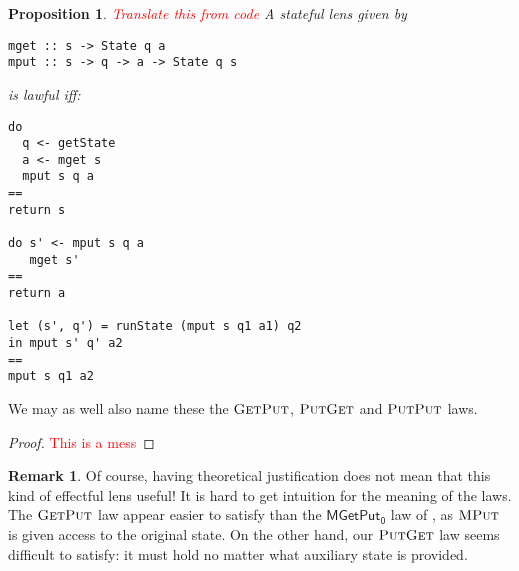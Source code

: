 \documentclass[11pt,a4paper]{article}
\theoremstyle{plain}
\newtheorem{proposition}[theorem]{Proposition}
\theoremstyle{definition}
\newtheorem{remark}[theorem]{Remark}
\newcommand{\C}{\mathscr{C}}
\newcommand{\homC}{\underline{\C}}
\newcommand{\fget}{\textsc{Get}}
\newcommand{\fput}{\textsc{Put}}
\newcommand{\mput}{\textsc{MPut}}
\newcommand{\todo}[1]{\textcolor{red}{\small #1}}
\begin{document}
\begin{proposition}
\todo{Translate this from code}
A stateful lens given by 
\begin{verbatim}
mget :: s -> State q a 
mput :: s -> q -> a -> State q s
\end{verbatim}
is lawful iff:
\begin{verbatim}
do
  q <- getState
  a <- mget s
  mput s q a
==
return s

do s' <- mput s q a
   mget s'
== 
return a

let (s', q') = runState (mput s q1 a1) q2
in mput s' q' a2
==
mput s q1 a2
\end{verbatim}
\end{proposition}
We may as well also name these the $\fget\fput$, $\fput\fget$ and $\fput\fput$ laws.
\begin{proof}
\todo{This is a mess}
\end{proof}

\begin{remark}
Of course, having theoretical justification does not mean that this kind of effectful lens useful! It is hard to get intuition for the meaning of the laws. The $\fget\fput$ law appear easier to satisfy than the $\mathsf{MGetPut_0}$ law of \cite{ReflectionsOnMonadicLenses}, as $\mput$ is given access to the original state. On the other hand, our $\fput\fget$ law seems difficult to satisfy: it must hold no matter what auxiliary state is provided.
\end{remark}
\end{document}

